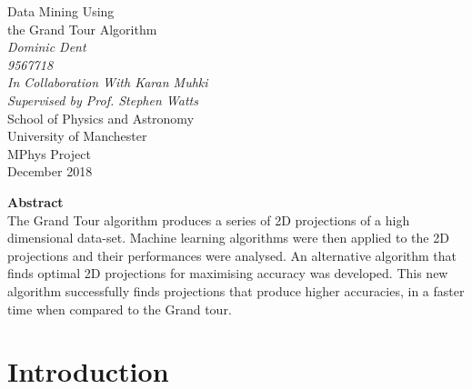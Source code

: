 \documentclass[a4paper,11pt,twoside]{article}
\begin{document}
\pagestyle{myStylePage}




\begin{titlepage} %
\begin{center} %


{\Huge Data Mining Using}\\[0.4cm]
{\Huge the Grand Tour Algorithm}\\[0.8cm] %
\textit{Dominic Dent}~\\[0.3cm] %
\textit{9567718}~\\[0.3cm]
\textit{In Collaboration With Karan Muhki}~\\[0.3cm]
\textit{Supervised by Prof. Stephen Watts}~\\[0.3cm]
School of Physics and Astronomy~\\[0.3cm]
University of Manchester~\\[0.3cm]
MPhys Project~\\[0.3cm]
December 2018~\\[2cm]

\vfill
\end{center}

{\Large \textbf{Abstract}}~\\[0.3cm]
The Grand Tour algorithm produces a series of 2D projections of a high dimensional data-set. Machine learning algorithms were then applied to the 2D projections and their performances were analysed. An alternative algorithm that finds optimal 2D projections for maximising accuracy was developed. This new algorithm successfully finds projections that produce higher accuracies, in a faster time when compared to the Grand tour.

\end{titlepage}
\clearpage
{} %
\setcounter{page}{2} %

\newpage %
\tableofcontents

\newpage

\section{Introduction}
\end{document}
